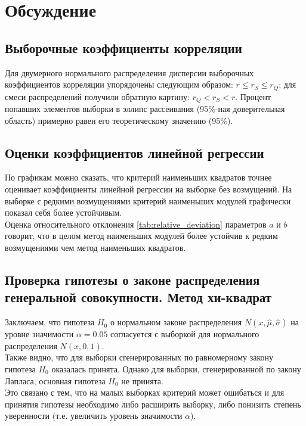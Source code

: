 \section{Обсуждение}
\subsection{Выборочные коэффициенты корреляции}
\noindent Для двумерного нормального распределения дисперсии выборочных коэффициентов корреляции упорядочены следующим образом: $r \leq r_{S} \leq r_{Q}$; для смеси распределений получили обратную картину: $r_{Q} < r_{S} < r$.
\newline
\noindent Процент попавших элементов выборки в эллипс рассеивания (95$\%$-ная доверительная область) примерно равен его теоретическому значению (95$\%$).
\subsection{Оценки коэффициентов линейной регрессии}
\noindent По графикам можно сказать, что критерий наименьших квадратов точнее оценивает коэффициенты линейной регрессии на выборке без возмущений. На выборке с редкими возмущениями критерий наименьших модулей графически показал себя более устойчивым. \\
Оценка относительного отклонения \eqref{tab:relative_deviation} параметров $a$ и $b$ говорит, что в целом метод наименьших модулей более устойчив к редким возмущениями чем метод наименьших квадратов.

\subsection{Проверка гипотезы о законе распределения генеральной совокупности. Метод хи-квадрат}

\noindent Заключаем, что гипотеза $H_{0}$ о нормальном законе распределения $N(x,\hat{\mu}, \hat{\sigma})$ на уровне значимости $\alpha = 0.05$ согласуется с выборкой для нормального распределения $N(x, 0, 1)$.
\\
Также видно, что для выборки сгенерированных по равномерному закону гипотеза $H_{0}$ оказалась принята. Однако для выборки, сгенерированной по закону Лапласа, основная гипотеза  $H_{0}$ не принята. \\ 
Это связано с тем, что на малых выборках критерий может ошибаться и для принятия гипотезы необходимо либо расширить выборку, либо понизить степень уверенности (т.е. увеличить уровень значимости $\alpha$).


